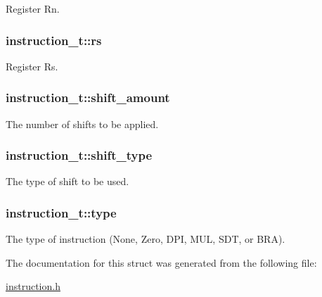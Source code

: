 Register Rn. 

\subsubsection[{\texorpdfstring{rs}{rs}}]{ instruction\+\_\+t\+::rs}\hypertarget{structinstruction__t_a221c733fee7743d19a2468541eb3a6f2}{}\label{structinstruction__t_a221c733fee7743d19a2468541eb3a6f2}


Register Rs. 

\subsubsection[{\texorpdfstring{shift\+\_\+amount}{shift_amount}}]{ instruction\+\_\+t\+::shift\+\_\+amount}\hypertarget{structinstruction__t_ac6da93636b5b619f0ee7c5405b185e5d}{}\label{structinstruction__t_ac6da93636b5b619f0ee7c5405b185e5d}


The number of shifts to be applied. 

\subsubsection[{\texorpdfstring{shift\+\_\+type}{shift_type}}]{ instruction\+\_\+t\+::shift\+\_\+type}\hypertarget{structinstruction__t_a13483a9191b2197c4ed899f3889ad801}{}\label{structinstruction__t_a13483a9191b2197c4ed899f3889ad801}


The type of shift to be used. 

\subsubsection[{\texorpdfstring{type}{type}}]{ instruction\+\_\+t\+::type}\hypertarget{structinstruction__t_a3692cf5692ee00e944ee0cb5e69190e7}{}\label{structinstruction__t_a3692cf5692ee00e944ee0cb5e69190e7}


The type of instruction (None, Zero, D\+PI, M\+UL, S\+DT, or B\+RA). 



The documentation for this struct was generated from the following file\+:\begin{DoxyCompactItemize}
\item 
\hyperlink{instruction_8h}{instruction.\+h}\end{DoxyCompactItemize}
